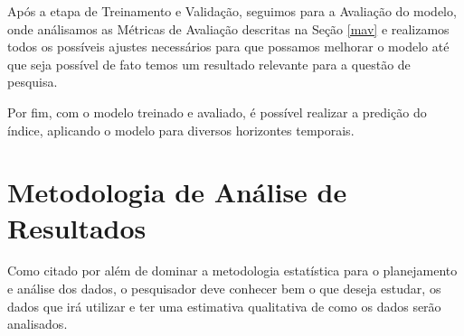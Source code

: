 Após a etapa de Treinamento e Validação, seguimos para a Avaliação do modelo, onde análisamos as Métricas de Avaliação descritas na Seção \ref{mav} e realizamos todos os possíveis ajustes necessários para que possamos melhorar o modelo até que seja possível de fato temos um resultado relevante para a questão de pesquisa.

Por fim, com o modelo treinado e avaliado, é possível realizar a predição do índice, aplicando o modelo para diversos horizontes temporais.


\section{Metodologia de Análise de Resultados}
\label{mar}

Como citado por \cite{analise_resultados1} além de dominar a metodologia estatística para o planejamento e análise dos dados, o pesquisador deve conhecer bem o que deseja estudar, os dados que irá utilizar e ter uma estimativa qualitativa de como os dados serão analisados.

